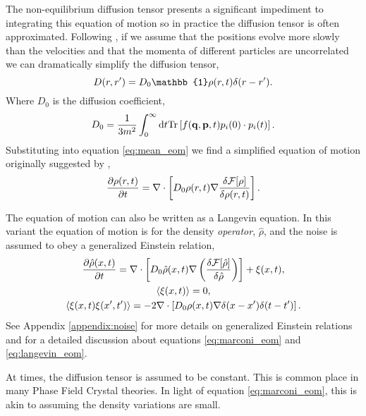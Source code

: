 The non-equilibrium diffusion tensor presents a significant impediment to
integrating this equation of motion so in practice the diffusion tensor is
often approximated. Following \cite{ESPANOL09}, if we assume that the positions
evolve more slowly than the velocities and that the momenta of different
particles are uncorrelated we can dramatically simplify the diffusion tensor,
%
\begin{equation}
    D(r, r^\prime) = D_0\mathbb{1}\rho(r, t)\d(r - r^\prime).
\end{equation}
%
Where $D_0$ is the diffusion coefficient,
%
\begin{equation}
    D_0 = \frac{1}{3 m^2} \int_0^\infty \mathrm{d}t 
        \mathrm{Tr}\left[ f(\mathbf{q}, \mathbf{p}, t) p_i(0) \cdot p_i(t) \right].
\end{equation}
%
Substituting into equation \ref{eq:mean_eom} we find a simplified equation of
motion originally suggested by \cite{MT1999},
%
\begin{equation}
    \label{eq:marconi_eom}
    \frac{\partial \rho(r, t)}{\partial t} = 
        \nabla \cdot \left[ D_0 \rho(r, t)
        \nabla \frac{\delta \mathcal{F}[\rho]}{\delta \rho(r, t)}\right].
\end{equation}
%

The equation of motion can also be written as a Langevin equation. In this
variant the equation of motion is for the density \textit{operator},
$\hat{\rho}$, and the noise is assumed to obey a generalized Einstein relation,
%
\begin{gather}
    \label{eq:langevin_eom}
    \frac{\partial \hat{\rho}(x, t)}{\partial t} =
        \nabla \cdot \left[
            D_0 \hat{\rho}(x, t) \nabla \left(
            \frac{\delta \mathcal{F}[\hat{\rho}]}{\delta \hat{\rho}}\right)
            \right] + \xi(x, t), \\
    \left\langle \xi(x, t) \right\rangle = 0, \\
    \left\langle \xi(x, t)\xi(x^\prime, t^\prime) \right\rangle = 
        -2 \nabla \cdot \left[ D_0 \rho(x,t) 
            \nabla \delta(x - x^\prime) \delta(t - t^\prime)\right].
\end{gather}
%
See Appendix \ref{appendix:noise} for more details on generalized Einstein
relations and \cite{AR2004} for a detailed discussion about equations
\ref{eq:marconi_eom} and \ref{eq:langevin_eom}.

At times, the diffusion tensor is assumed to be constant. This is common place
in many Phase Field Crystal theories. In light of equation
\ref{eq:marconi_eom}, this is akin to assuming the density variations are
small.


